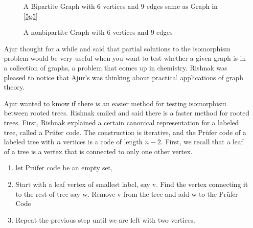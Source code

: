 \begin{figure}

\caption{ A Bipartite Graph with 6 vertices and 9 edges same as Graph in \ref{5g5}}\label{8g3}

\end{figure}

\begin{figure}

\caption{ A nonbipartite Graph with 6 vertices and 9 edges}\label{8g4}

\end{figure}

Ajur thought for a while and said that partial solutions to the isomorphism problem would be very useful when you want to test whether a given graph is in a collection of graphs, a problem that comes up in chemistry. Rishnak was pleased to notice that Ajur's was thinking about practical applications of graph theory. 

Ajur wanted to kmow if there is an easier method for testing isomorphism between rooted trees. Rishnak smiled and said there is a faster method for rooted trees. First, Rishnak explained a certain canonical representation for a labeled tree, called a Pr\"ufer code. The construction is iterative, and the Pr\"ufer code of a labeled tree with $n$ vertices is a code of length $n-2$. First, we recall that a leaf of a tree is a vertex that is connected to only one other vertex.

\begin{enumerate}
\item let Pr{\"u}fer code be an empty set,

\item Start with a leaf vertex of smallest label, say v. Find the vertex connecting it to the rest of tree say w.  Remove v from the tree and add w to the Pr{\"u}fer Code
 
\item Repeat the previous step until we are left with two vertices.
\end{enumerate}

